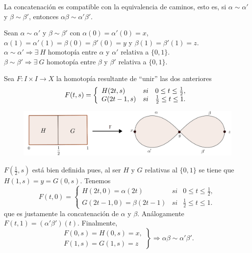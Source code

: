 \documentclass[bibtex, anon]{TEMat-article}
\begin{document}
\begin{lema} La concatenación es compatible con la equivalencia de caminos, esto es, si $\alpha\sim\alpha'$ y $\beta\sim\beta'$, entonces $\alpha\beta\sim\alpha'\beta'$. 
\end{lema}
\begin{demostracion}
	Sean $\alpha\sim\alpha'$ y $\beta\sim\beta'$ con $\alpha(0)=\alpha'(0)=x$, $\alpha(1)=\alpha'(1)=\beta(0)=\beta'(0)=y$ y $\beta(1)=\beta'(1)=z$.\\
	$\alpha\sim\alpha'\Rightarrow\exists\ H$ homotopía entre $\alpha$ y $\alpha'$ relativa a $\{0,1\}$.\\
	$\beta\sim\beta'\Rightarrow\exists\ G$ homotopía entre $\beta$ y $\beta'$ relativa a $\{0,1\}$.
	
	Sea $F:I\times I\to X$ la homotopía resultante de ``unir'' las dos anteriores
	\[
	F(t,s)=\left\{\begin{array}{l c c}
	H(2t,s) & si & 0\leq t\leq\frac{1}{2},\\
	G(2t-1,s) & si &\frac{1}{2}\leq t\leq 1.
	
	\end{array}\right.
	\]
	\begin{figure}[h!]
		\centering
		\includegraphics[scale=0.28]{Imagenes/yuxta}
	\end{figure}
	
	$F\left(\frac{1}{2},s\right)$ está bien definida pues, al ser $H$ y $G$ relativas al $\{0,1\}$ se tiene que $H(1,s)=y=G(0,s)$. Tenemos
	\[
	F(t,0)=\left\{\begin{array}{lcc}
	H(2t,0)=\alpha(2t) & si & 0\leq t\leq\frac{1}{2},\\
	G(2t-1,0)=\beta(2t-1) & si & \frac{1}{2}\leq t\leq 1.
	\end{array}\right.
	\]
	que es justamente la concatenación de $\alpha$ y $\beta$. Análogamente $F(t,1)=(\alpha'\beta')(t)$. Finalmente,
	\[
	\left.\begin{array}{c}
	F(0,s)=H(0,s)=x,\\
	F(1,s)=G(1,s)=z
	\end{array}\right\}\Rightarrow \alpha\beta\sim\alpha'\beta'.
	\]
	
\end{demostracion}
\end{document}
